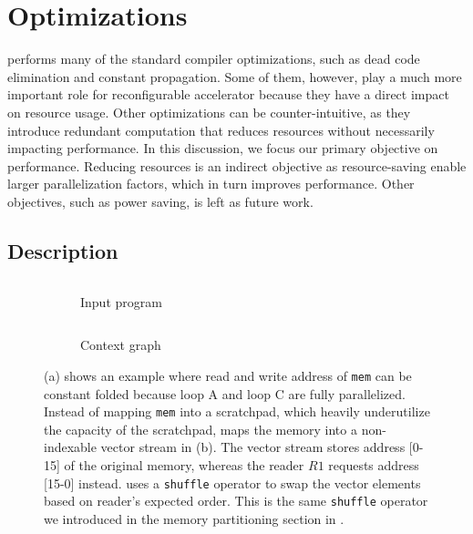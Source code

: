 \section{Optimizations}\label{sec:opt}
\name performs many of the standard compiler optimizations,
such as dead code elimination and constant propagation.
Some of them, however, play a much more important role for reconfigurable accelerator because they
have a direct impact on resource usage.
Other optimizations can be counter-intuitive, as they introduce redundant computation that
reduces resources without necessarily impacting performance.
In this discussion, we focus our primary objective on performance.
Reducing resources is an indirect objective as resource-saving enable larger parallelization factors,
which in turn improves performance.
Other objectives, such as power saving, is left as future work.

\subsection{Description}\label{sec:des}

\begin{figure}
\centering
\begin{subfigure}[b]{0.4\textwidth}
\inputminted{python}{code/msr.py}
\caption{Input program}
\end{subfigure}
\hfill
\begin{subfigure}[b]{0.5\textwidth}
\inputminted{python}{code/msrctx.py}
\caption{Context graph}
\end{subfigure}
\caption[Memory strength reduction]{
  (a) shows an example where read and write address of \texttt{mem} can be constant folded because
  loop A and loop C are fully parallelized.
  Instead of mapping \texttt{mem} into a scratchpad, which heavily underutilize the capacity of the 
  scratchpad, \name maps the memory into a non-indexable vector stream in (b). The vector stream
  stores address [0-15] of the original memory, whereas the reader $R1$ requests address [15-0] instead.
  \name uses a \texttt{shuffle} operator to swap the vector elements based on reader's expected order.
  This is the same \texttt{shuffle} operator we introduced in the memory partitioning section in
  . 
}
\label{fig:msr}
\end{figure}

